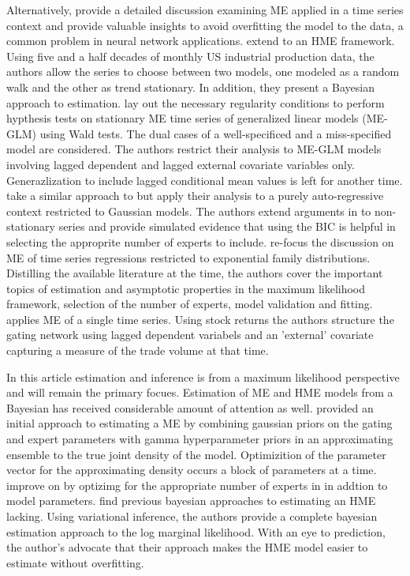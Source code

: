\documentclass[12pt]{article}
\begin{document}
Alternatively, \cite{WMS1995} provide a detailed discussion 
examining ME applied in a time series context and provide valuable
insights to avoid overfitting the model to the data, a common problem in
neural network applications. \cite{HuertaJiangTanner2003} extend \cite{WMS1995} to an HME
framework. Using five and a half decades of monthly US industrial production
data, the authors allow the series to choose between two models, one modeled
as a random walk and the other as trend stationary. In addition, they present a
Bayesian approach to estimation. \cite{CarvalhoTanner2003} lay out the necessary regularity conditions to perform
hypthesis tests on stationary ME time series of generalized linear models (ME-GLM)
using Wald tests. The dual cases of a well-specificed and a miss-specified model
are considered. The authors restrict their analysis to ME-GLM models involving
lagged dependent and lagged external covariate variables only. Generazlization to
include lagged conditional mean values is left for another time.
\cite{CarvalhoTanner2005} take a similar approach to \cite{CarvalhoTanner2003} but
apply their analysis to a purely auto-regressive context restricted to Gaussian models.
The authors extend arguments in \cite{CarvalhoTanner2003} to non-stationary series and
provide simulated evidence that using the BIC is helpful in selecting the 
approprite number of experts to include. \cite{CarvalhoTanner2006} re-focus the discussion on ME of time series
regressions restricted to exponential family distributions. Distilling
the available literature at the time, the authors cover the important
topics of estimation and asymptotic properties in the maximum likelihood
framework, selection of the number of experts, model validation and
fitting. \cite{CarvalhoSkoulakis2010} applies ME of a single time series.
Using stock returns the authors structure the gating network using lagged
dependent variabels and an 'external' covariate capturing a measure of the
trade volume at that time.

\bigskip

In this article estimation and inference is from a maximum likelihood 
perspective and will remain the primary focues. Estimation of ME and HME
models from a Bayesian has received considerable amount of attention as well.
\cite{Waterhouse1995BayesianMF} provided an initial approach to estimating
a ME by combining gaussian priors on the gating and expert parameters
with gamma hyperparameter priors in an approximating ensemble to the true
joint density of the model. Optimizition of the parameter vector for the approximating density
occurs a block of parameters at a time. \cite{UedaGhahramani2002} improve
on \cite{Waterhouse1995BayesianMF} by optizimg for the appropriate number of
experts in in addtion to  model parameters. \cite{BishopSvenson2003} find
previous bayesian approaches to estimating an HME lacking. Using variational inference, the authors provide a
complete bayesian estimation approach to the log marginal likelihood. With an eye
to prediction, the author's advocate that their approach makes the HME model
easier to estimate without overfitting.
\end{document}
